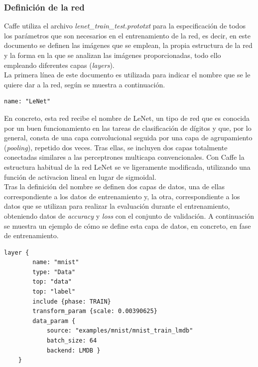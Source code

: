 \subsubsection{Definición de la red}
	Caffe utiliza el archivo 
	\textit{lenet\_train\_test.prototxt} para la especificación de todos los parámetros que son necesarios en el entrenamiento de la red, es decir, en este documento se definen las imágenes que se emplean, la propia estructura de la red y la forma en la que se analizan las imágenes proporcionadas, todo ello empleando diferentes capas (\textit{layers}).\\

	La primera línea de este documento es utilizada para indicar el nombre que se le quiere dar a la red, según se muestra a continuación.
	\vspace{10pt}
	\begin{lstlisting}[frame=single]
	name: "LeNet"
	\end{lstlisting}
	
	En concreto, esta red recibe el nombre de LeNet, un tipo de red que es conocida por un buen funcionamiento en las tareas de clasificación de dígitos y que, por lo general, consta de una capa convolucional seguida por una capa de agrupamiento (\textit{pooling}), repetido dos veces. Tras ellas, se incluyen dos capas totalmente conectadas similares a las perceptrones multicapa convencionales. Con Caffe la estructura habitual de la red LeNet se ve ligeramente modificada, utilizando una función de activacion lineal en lugar de sigmoidal.\\

	Tras la definición del nombre se definen dos capas de datos, una de ellas correspondiente a los datos de entrenamiento y, la otra, correspondiente a los datos que se utilizan para realizar la evaluación durante el entrenamiento, obteniendo datos de \textit{accuracy} y \textit{loss} con el conjunto de validación. A continuación se muestra un ejemplo de cómo se define esta capa de datos, en concreto, en fase de entrenamiento.
	\vspace{60pt}
	\begin{lstlisting}[frame=single]
	layer {
		name: "mnist"
		type: "Data"
		top: "data"
		top: "label"
		include {phase: TRAIN}
		transform_param {scale: 0.00390625}
		data_param {
			source: "examples/mnist/mnist_train_lmdb"
			batch_size: 64
			backend: LMDB }
	}
	\end{lstlisting}
	
